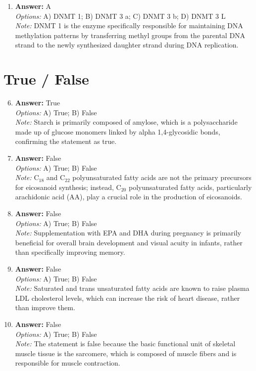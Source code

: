 \documentclass[12pt]{article}
\begin{document}
\begin{enumerate}[label=\arabic*.]
\item \textbf{Answer:} A
\\ \textit{Options:} A) DNMT 1; B) DNMT 3 a; C) DNMT 3 b; D) DNMT 3 L
\\ \textit{Note:} DNMT 1 is the enzyme specifically responsible for maintaining DNA methylation patterns by transferring methyl groups from the parental DNA strand to the newly synthesized daughter strand during DNA replication.
\end{enumerate}

\section*{True / False}
\begin{enumerate}[label=\arabic*.]
\setcounter{enumi}{5}
\item \textbf{Answer:} True
\\ \textit{Options:} A) True; B) False
\\ \textit{Note:} Starch is primarily composed of amylose, which is a polysaccharide made up of glucose monomers linked by alpha 1,4-glycosidic bonds, confirming the statement as true.
\item \textbf{Answer:} False
\\ \textit{Options:} A) True; B) False
\\ \textit{Note:} C$_{18}$ and C$_{22}$ polyunsaturated fatty acids are not the primary precursors for eicosanoid synthesis; instead, C$_{20}$ polyunsaturated fatty acids, particularly arachidonic acid (AA), play a crucial role in the production of eicosanoids.
\item \textbf{Answer:} False
\\ \textit{Options:} A) True; B) False
\\ \textit{Note:} Supplementation with EPA and DHA during pregnancy is primarily beneficial for overall brain development and visual acuity in infants, rather than specifically improving memory.
\item \textbf{Answer:} False
\\ \textit{Options:} A) True; B) False
\\ \textit{Note:} Saturated and trans unsaturated fatty acids are known to raise plasma LDL cholesterol levels, which can increase the risk of heart disease, rather than improve them.
\item \textbf{Answer:} False
\\ \textit{Options:} A) True; B) False
\\ \textit{Note:} The statement is false because the basic functional unit of skeletal muscle tissue is the sarcomere, which is composed of muscle fibers and is responsible for muscle contraction.
\end{enumerate}
\end{document}

